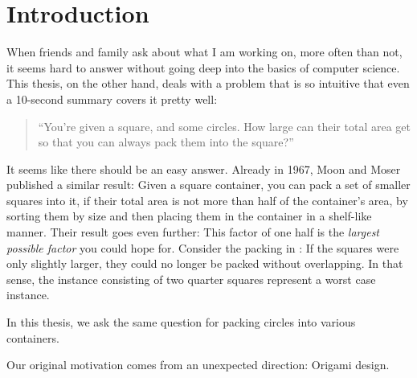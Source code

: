\documentclass[a4paper,style=print,bibliography=totoc,nexus,lnum,extramargin]{tubsbook}
\begin{document}
\cleardoublepage
\setcounter{tocdepth}{2}

\tableofcontents
\cleardoublepage

%

\mainmatter %

\chapter{Introduction}

When friends and family ask about what I am working on, more often than not, it seems hard to answer without going deep into the basics of computer science. This thesis, on the other hand, deals with a problem that is so intuitive that even a 10-second summary covers it pretty well:

\begin{quote}
    “You're given a square, and some circles. How large can their total area get so that you can always pack them into the square?”
\end{quote}

It seems like there should be an easy answer. Already in 1967, Moon and Moser published a similar result: Given a square container, you can pack a set of smaller squares into it, if their total area is not more than half of the container's area, by sorting them by size and then placing them in the container in a shelf-like manner. Their result goes even further: This factor of one half is the \emph{largest possible factor} you could hope for. Consider the packing in : If the squares were only slightly larger, they could no longer be packed without overlapping. In that sense, the instance consisting of two quarter squares represent a worst case instance.


In this thesis, we ask the same question for packing circles into various containers.

Our original motivation comes from an unexpected direction: Origami design.


\end{document}

